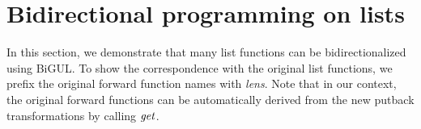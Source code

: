 













\section{Bidirectional programming on lists}
\label{sec:lists}


In this section, we demonstrate that
many list functions can be bidirectionalized
using BiGUL. To show the correspondence with the original list functions,
we prefix
the original forward function names with \emph{lens}. Note that in our context,
the original forward
functions can be automatically derived from the new putback transformations
by calling \ensuremath{\Varid{get}}.

